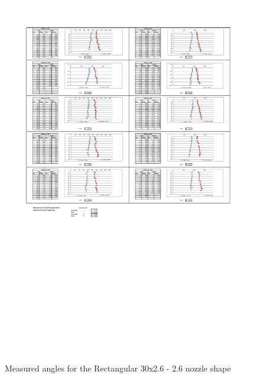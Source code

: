 \begin{figure}[ht]
    \centering
    \includegraphics[width=\linewidth]{Images/Rec30_26.pdf}
    \caption{Measured angles for the Rectangular 30x2.6 - 2.6 nozzle shape}
\end{figure}

